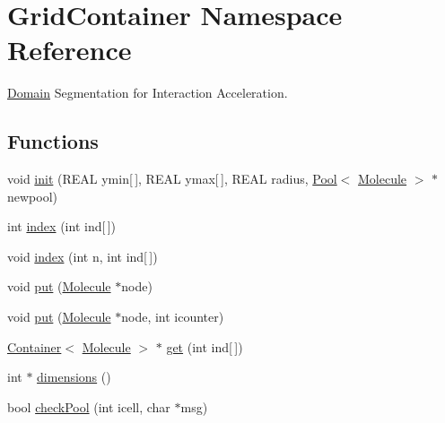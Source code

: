 \hypertarget{namespaceGridContainer}{
\section{GridContainer Namespace Reference}
\label{namespaceGridContainer}
}
\hyperlink{classDomain}{Domain} Segmentation for Interaction Acceleration.  


\subsection*{Functions}
\begin{CompactItemize}
\item 
void \hyperlink{namespaceGridContainer_3c2159285b7a2cb3ed85be77f4c4a9f1}{init} (REAL ymin\mbox{[}$\,$\mbox{]}, REAL ymax\mbox{[}$\,$\mbox{]}, REAL radius, \hyperlink{structPool}{Pool}$<$ \hyperlink{classMolecule}{Molecule} $>$ $\ast$newpool)
\item 
int \hyperlink{namespaceGridContainer_7d5bce24ba1e580809a8b7028255185c}{index} (int ind\mbox{[}$\,$\mbox{]})
\item 
void \hyperlink{namespaceGridContainer_4a68b0ee2452c91a40d267ddc754f5a6}{index} (int n, int ind\mbox{[}$\,$\mbox{]})
\item 
void \hyperlink{namespaceGridContainer_845e12d4267175b1b7a424e34f257bd3}{put} (\hyperlink{classMolecule}{Molecule} $\ast$node)
\item 
void \hyperlink{namespaceGridContainer_e124418779521e23e19f513829d3126e}{put} (\hyperlink{classMolecule}{Molecule} $\ast$node, int icounter)
\item 
\hyperlink{classContainer}{Container}$<$ \hyperlink{classMolecule}{Molecule} $>$ $\ast$ \hyperlink{namespaceGridContainer_a7d85bbf45b4a2553d49cc6e020eacbf}{get} (int ind\mbox{[}$\,$\mbox{]})
\item 
int $\ast$ \hyperlink{namespaceGridContainer_2152d021e14ed0184e7fe304026bcbb0}{dimensions} ()
\item 
bool \hyperlink{namespaceGridContainer_571ededa15fba6600603a030866dd2c5}{checkPool} (int icell, char $\ast$msg)
\end{CompactItemize}
